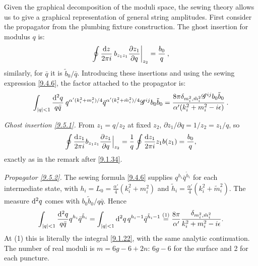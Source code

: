 Given the graphical decomposition of the moduli space, the sewing theory allows us to give a graphical representation of general string amplitudes. First consider the propagator from the plumbing fixture construction.
The ghost insertion for modulus $q$ is:
\begin{equation}
	\oint \frac{\mathrm{d} z}{2 \pi i} \: b_{z_{1} z_{1}} \frac{\partial z_{1}}{\partial q}\biggr|_{z_{2}}=\frac{b_{0}}{q} \:, \label{9.5.1}
\end{equation}
similarly, for $\bar{q}$ it is $\tilde{b}_{0} / \bar{q}$.
Introducing these insertions and using the sewing expression \eqref{9.4.6}, the factor attached to the propagator is:
\begin{equation}
	\int_{|q|<1} \frac{\mathrm{d}^{2} q}{q \bar{q}} \: q^{\alpha^{\prime}(k_{i}^{2}+m_{i}^{2})/4} 
	\bar{q}^{\alpha^{\prime}(k_{i}^{2}+\tilde{m}_{i}^{2})/4} \mathscr{G}^{ij} b_{0} \tilde{b}_{0}
	= \frac{8 \pi \delta_{m_{i}^{2}, \tilde{m}_{i}^{2}} \mathscr{G}^{ij} b_{0} \tilde{b}_{0}}{\alpha^{\prime}(k_{i}^{2}+m_{i}^{2}-i \epsilon)} \:.
	\label{9.5.2}
\end{equation}
\begin{tcolorbox}[breakable]
	\begin{remark}
		\emph{Ghost insertion \eqref{9.5.1}.} From $z_1=q/z_2$ at fixed $z_2$, $\partial z_1/\partial q=1/z_2=z_1/q$, so
		\begin{equation*}
			\oint\frac{\mathrm{d} z_1}{2\pi i}b_{z_1z_1}\frac{\partial z_1}{\partial q}\Bigr|_{z_2}=\frac1q\oint\frac{\mathrm{d} z_1}{2\pi i}z_1b(z_1)=\frac{b_0}{q},
		\end{equation*}
		exactly as in the remark after \eqref{9.1.34}.

		\emph{Propagator \eqref{9.5.2}.} The sewing formula \eqref{9.4.6} supplies $q^{h_i}\bar q^{\tilde h_i}$ for each intermediate state, with $h_i=L_0=\frac{\alpha'}{4}(k_i^2+m_i^2)$ and $\tilde h_i=\frac{\alpha'}{4}(k_i^2+\tilde m_i^2)$. The measure $\mathrm{d}^2q$ comes with $b_0\tilde b_0/q\bar q$. Hence
		\begin{equation*}
			\int_{|q|<1}\frac{\mathrm{d}^2q}{q\bar q}q^{h_i}\bar q^{\tilde h_i}=\int_{|q|<1}\mathrm{d}^2q\,q^{h_i-1}\bar q^{\tilde h_i-1}\overset{(1)}{=}\frac{8\pi}{\alpha'}\frac{\delta_{m_i^2,\tilde m_i^2}}{k_i^2+m_i^2-i\epsilon} .
		\end{equation*}
		At (1) this is literally the integral \eqref{9.1.22}, with the same analytic continuation. The number of real moduli is $m=6g-6+2n$: $6g-6$ for the surface and 2 for each puncture.
	\end{remark}
\end{tcolorbox}
